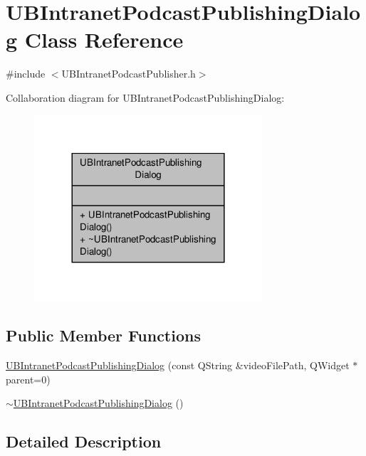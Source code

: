 \hypertarget{class_u_b_intranet_podcast_publishing_dialog}{\section{U\-B\-Intranet\-Podcast\-Publishing\-Dialog Class Reference}
\label{d0/dfd/class_u_b_intranet_podcast_publishing_dialog}
}


{\ttfamily \#include $<$U\-B\-Intranet\-Podcast\-Publisher.\-h$>$}



Collaboration diagram for U\-B\-Intranet\-Podcast\-Publishing\-Dialog\-:
\nopagebreak
\begin{figure}[H]
\begin{center}
\leavevmode
\includegraphics[width=240pt]{df/da7/class_u_b_intranet_podcast_publishing_dialog__coll__graph}
\end{center}
\end{figure}
\subsection*{Public Member Functions}
\begin{DoxyCompactItemize}
\item 
\hyperlink{class_u_b_intranet_podcast_publishing_dialog_ad0aac5a648d1e17638a8dc56f381dd05}{U\-B\-Intranet\-Podcast\-Publishing\-Dialog} (const Q\-String \&video\-File\-Path, Q\-Widget $\ast$parent=0)
\item 
\hyperlink{class_u_b_intranet_podcast_publishing_dialog_a261e24efd6810bea42e5ebf198c2d6ad}{$\sim$\-U\-B\-Intranet\-Podcast\-Publishing\-Dialog} ()
\end{DoxyCompactItemize}


\subsection{Detailed Description}


